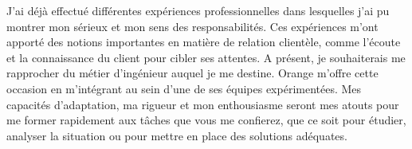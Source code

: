 \documentclass[11pt, a4paper]{awesome-cv}
\begin{document}
\begin{cvletter}
\vspace{2mm} 

J'ai déjà effectué différentes expériences professionnelles dans lesquelles j'ai pu montrer mon sérieux et mon sens des responsabilités. Ces expériences m'ont apporté des notions importantes en matière de relation clientèle, comme l'écoute et la connaissance du client pour cibler ses attentes. A présent, je souhaiterais me rapprocher du métier d'ingénieur auquel je me destine. Orange m'offre cette occasion en m'intégrant au sein d'une de ses équipes expérimentées. Mes capacités d'adaptation, ma rigueur et mon enthousiasme seront mes atouts pour me former rapidement aux tâches que vous me confierez, que ce soit pour étudier, analyser la situation ou pour mettre en place des solutions adéquates.




\end{cvletter}


\makeletterclosing
\end{document}

